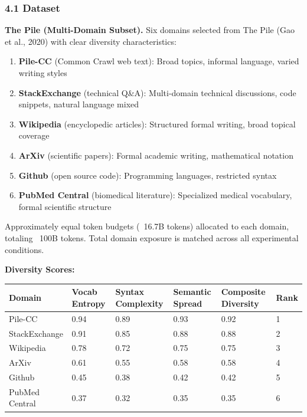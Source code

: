 
\subsubsection{4.1 Dataset}

\textbf{The Pile (Multi-Domain Subset).} Six domains selected from The Pile (Gao et al., 2020) with clear diversity characteristics:

\begin{enumerate}
\item \textbf{Pile-CC} (Common Crawl web text): Broad topics, informal language, varied writing styles
\item \textbf{StackExchange} (technical Q\&A): Multi-domain technical discussions, code snippets, natural language mixed
\item \textbf{Wikipedia} (encyclopedic articles): Structured formal writing, broad topical coverage
\item \textbf{ArXiv} (scientific papers): Formal academic writing, mathematical notation
\item \textbf{Github} (open source code): Programming languages, restricted syntax
\item \textbf{PubMed Central} (biomedical literature): Specialized medical vocabulary, formal scientific structure
\end{enumerate}

Approximately equal token budgets (~16.7B tokens) allocated to each domain, totaling ~100B tokens. Total domain exposure is matched across all experimental conditions.

\textbf{Diversity Scores:}

\begin{table}[htbp]
\centering
\begin{tabular}{llllll}
\toprule
Domain & Vocab Entropy & Syntax Complexity & Semantic Spread & Composite Diversity & Rank \\
\midrule
Pile-CC & 0.94 & 0.89 & 0.93 & 0.92 & 1 \\
StackExchange & 0.91 & 0.85 & 0.88 & 0.88 & 2 \\
Wikipedia & 0.78 & 0.72 & 0.75 & 0.75 & 3 \\
ArXiv & 0.61 & 0.55 & 0.58 & 0.58 & 4 \\
Github & 0.45 & 0.38 & 0.42 & 0.42 & 5 \\
PubMed Central & 0.37 & 0.32 & 0.35 & 0.35 & 6 \\
\bottomrule
\end{tabular}
\end{table}

